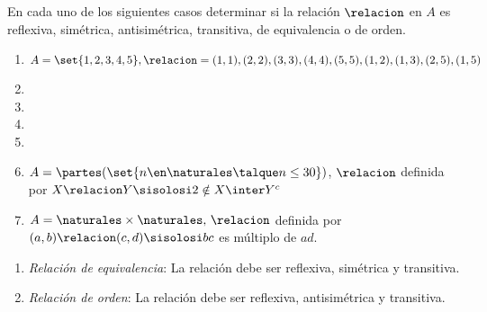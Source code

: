 \begin{enunciado}{\ejercicio}
  En cada uno de los siguientes casos determinar si la relación $\relacion $ en $A$ es reflexiva, simétrica,
  antisimétrica, transitiva, de equivalencia o de orden.
  \begin{enumerate}[label=\roman*)]
    \item  $A = \set{1,2,3,4,5}, \relacion = {(1,1), (2,2), (3,3), (4,4), (5,5), (1,2), (1,3), (2,5), (1,5)}$\\
    \item 

    \item 
    \item 
    \item 
    \item $A = \partes(\set{n \en \naturales \talque n \leq 30})$, $\relacion$ definida por $X \relacion Y \sisolosi 2 \notin X \inter Y^c$\\
    \item $A = \naturales \times \naturales,\, \relacion$ definida por $(a,b) \relacion (c,d) \sisolosi bc$ es múltiplo de $ad$.
  \end{enumerate}

\end{enunciado}

\begin{enumerate}
  \item \textit{Relación de equivalencia}: La relación debe ser reflexiva, simétrica y transitiva.
  \item \textit{Relación de orden}: La relación debe ser reflexiva, antisimétrica y transitiva.
\end{enumerate}

